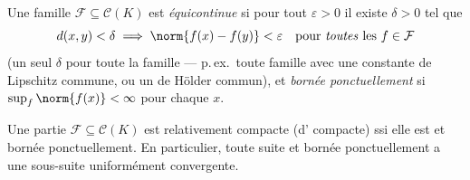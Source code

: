 \begin{definition}\label{def:b3:complete:equicontinuous}
Une famille $\mathcal F \subseteq \mathcal C(K)$ est
\emph{équicontinue} si pour tout
$\varepsilon > 0$ il existe $\delta > 0$ tel que
\[
d(x, y) < \delta \implies \norm{f(x) - f(y)} < \varepsilon
\quad\text{pour \emph{toutes} les } f \in \mathcal F
\]
(un seul $\delta$ pour toute la famille --- p.\,ex.\ toute
famille avec une constante de Lipschitz commune, ou un 
de Hölder commun), et \emph{bornée ponctuellement} si
$\sup_{f}\norm{f(x)} < \infty$ pour chaque $x$.
\end{definition}

\begin{theorem}\label{thm:b3:complete:ascoli}
Une partie $\mathcal F \subseteq \mathcal C(K)$ est
relativement compacte (d' compacte) ssi elle est
 et bornée ponctuellement. En particulier, toute
suite  et bornée ponctuellement a une sous-suite
uniformément convergente.
\end{theorem}


